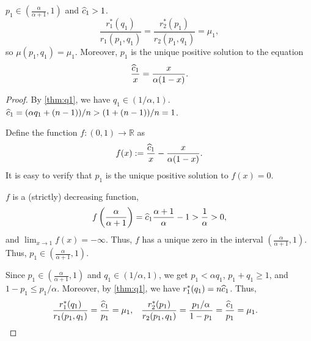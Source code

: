 \begin{lemma}
\label{thm:p1}
$p_1 \in (\frac{\alpha}{\alpha+1}, 1)$ and $\widehat{c}_1 > 1$.
\[ \frac{r_1^*(q_1)}{r_1(p_1, q_1)} = \frac{r_2^*(p_1)}{r_2(p_1, q_1)} = \mu_1, \]
so $\mu(p_1, q_1) = \mu_1$.
Moreover, $p_1$ is the unique positive solution to the equation
\[ \frac{\widehat{c}_1}{x} = \frac{x}{\alpha(1-x)}. \]
\end{lemma}
\begin{proof}
By \cref{thm:q1}, we have $q_1 \in (1/\alpha, 1)$.
$\widehat{c}_1 = (\alpha q_1 + (n-1))/n > (1 + (n-1))/n = 1$.

Define the function $f: (0, 1) \to \mathbb{R}$ as
\[ f(x) := \frac{\widehat{c}_1}{x} - \frac{x}{\alpha(1-x)}. \]
It is easy to verify that $p_1$ is the unique positive solution to $f(x) = 0$.

$f$ is a (strictly) decreasing function,
\[ f\left(\frac{\alpha}{\alpha+1}\right) = \widehat{c}_1\frac{\alpha+1}{\alpha} - 1 > \frac{1}{\alpha} > 0, \]
and $\lim_{x \to 1} f(x) = -\infty$.
Thus, $f$ has a unique zero in the interval $(\frac{\alpha}{\alpha+1}, 1)$.
Thus, $p_1 \in (\frac{\alpha}{\alpha+1}, 1)$.

Since $p_1 \in (\frac{\alpha}{\alpha+1}, 1)$ and $q_1 \in (1/\alpha, 1)$,
we get $p_1 < \alpha q_1$, $p_1 + q_1 \ge 1$, and $1-p_1 \le p_1/\alpha$.
Moreover, by \cref{thm:q1}, we have $r_1^*(q_1) = n\widehat{c}_1$. Thus,
\begin{align*}
\frac{r_1^*(q_1)}{r_1(p_1, q_1)} &= \frac{\widehat{c}_1}{p_1} = \mu_1,
& \frac{r_2^*(p_1)}{r_2(p_1, q_1)} &= \frac{p_1/\alpha}{1-p_1} = \frac{\widehat{c}_1}{p_1} = \mu_1.
\qedhere \end{align*}
\end{proof}

